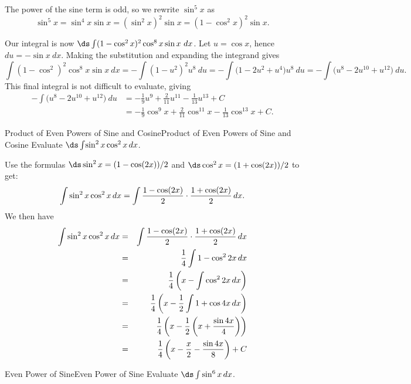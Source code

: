 \begin{solution} 
The power of the sine term is odd, so we rewrite $\sin^5x$ as $$\sin^5x = \sin^4x\sin x = (\sin^2x)^2\sin x = (1-\cos^2x)^2\sin x.$$

Our integral is now $\ds \int (1-\cos^2x)^2\cos^8x\sin x\ dx$. Let $u = \cos x$, hence $du = -\sin x\ dx$. Making the substitution and expanding the integrand gives
$$\int (1-\cos^2)^2\cos^8x\sin x\ dx = -\int (1-u^2)^2u^8\ du = -\int \big(1-2u^2+u^4\big)u^8\ du = -\int \big(u^8-2u^{10}+u^{12}\big)\ du.$$
This final integral is not difficult to evaluate, giving 
\begin{align*} -\int \big(u^8-2u^{10}+u^{12}\big)\ du &= -\frac19u^9 + \frac2{11}u^{11} - \frac1{13}u^{13} + C \\
										&=-\frac19\cos^9 x + \frac2{11}\cos^{11} x - \frac1{13}\cos^{13} x + C.
\end{align*}
\end{solution}






\begin{example}{Product of Even Powers of Sine and Cosine}{Product of Even Powers of Sine and Cosine}\label{Product of Even Powers of Sine and Cosine}
Evaluate $\ds\int\! \sin^2x\cos^2x\,dx$. 
\end{example}

\begin{solution} 
Use the formulas
$\ds \sin^2x =(1-\cos(2x))/2$ and $\ds \cos^2x =(1+\cos(2x))/2$ to get:
$$
  \int \sin^2x\cos^2x\,dx=\int {1-\cos(2x)\over2}\cdot
  {1+\cos(2x)\over2}\,dx.
$$
We then have
\begin{eqnarray*}
\int \sin^2x\cos^2x\,dx&=&\int {1-\cos(2x)\over2}\cdot{1+\cos(2x)\over2}\,dx\\
&=&{1\over4}\int 1-\cos^2 2x\,dx\\
&=&{1\over4}\left(x-\int\cos^2 2x\,dx\right)\\
&=&{1\over4}\left(x-{1\over2}\int 1+\cos4x \,dx\right)\\
&=&{1\over4}\left(x-{1\over2}\left(x+{\sin 4x\over 4}\right)\right)\\
&=&{1\over4}\left(x-{x\over2}-{\sin 4x\over 8}\right)+C
\end{eqnarray*}
\end{solution}


\begin{example}{Even Power of Sine}{Even Power of Sine}\label{Even Power of Sine}
Evaluate $\ds\int \sin^6 x\,dx$.
\end{example}

